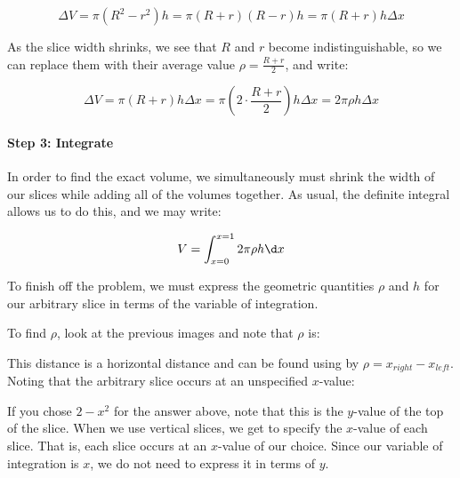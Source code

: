 \documentclass{ximera}
\begin{document}
\[
\Delta V = \pi (R^2-r^2)h = \pi(R+r)(R-r)h = \pi(R+r)h \Delta x
\] 

As the slice width shrinks, we see that $R$ and $r$ become indistinguishable, so we can replace them with their average value $\rho = \frac{R+r}{2}$, and write:

\[
\Delta V = \pi (R+r)h \Delta x = \pi (2 \cdot \frac{R+r}{2} )h \Delta x  = 2\pi \rho h \Delta x
\]        

\paragraph{Step 3: Integrate}
In order to find the exact volume, we simultaneously must shrink the width of our slices while adding all of the volumes together.  As usual, the definite integral allows us to do this, and we may write:

\[
V= \int_{x=0}^{x=1} 2 \pi \rho h \d x 
\]    

To finish off the problem, we must express the geometric quantities $\rho$ and $h$ for our arbitrary slice in terms of the variable of integration.

To find $\rho$, look at the previous images and note that $\rho$ is:

\begin{multipleChoice}
\end{multipleChoice}

This distance is a horizontal distance and can be found using by $\rho = x_{right}-x_{left}$.  Noting that the arbitrary slice occurs at an unspecified $x$-value:

\begin{multipleChoice}
\end{multipleChoice}
 
 \begin{feedback}
 If you chose $2-x^2$ for the answer above, note that this is the $y$-value of the top of the slice.  When we use vertical slices, we get to specify the $x$-value of each slice.  That is, each slice occurs at an $x$-value of our choice.  Since our variable of integration is $x$, we do not need to express it in terms of $y$.   
 \end{feedback}

\begin{multipleChoice}
\end{multipleChoice}
\end{document}
